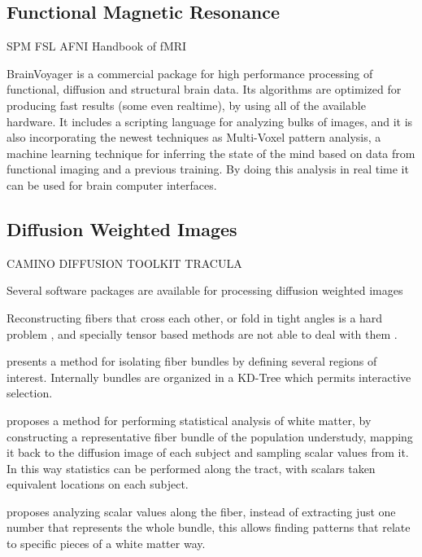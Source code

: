 \subsection{Functional Magnetic Resonance}

SPM
FSL
AFNI
Handbook of fMRI

BrainVoyager \autocite{goebel_brainvoyagerpast_2012} is a commercial package for high performance processing of functional, diffusion and structural brain data. Its algorithms are optimized for producing fast results (some even realtime), by using all of the available hardware. It includes a scripting language for analyzing bulks of images, and it is also incorporating the newest techniques as Multi-Voxel pattern analysis, a machine learning technique for inferring the state of the mind based on data from functional imaging and a previous training. By doing this analysis in real time it can be used for brain computer interfaces. 

\subsection{Diffusion Weighted Images}

CAMINO
DIFFUSION TOOLKIT
TRACULA



Several software packages are available for processing diffusion weighted images \autocite{hasan_review_2011}

Reconstructing fibers that cross each other, or fold in tight angles is a hard problem \autocite{fillard_quantitative_2011}, and specially tensor based methods are not able to deal with them \autocite{tournier_diffusion_2011}.


\autocite{blaas_fast_2005} presents a method for isolating fiber bundles by defining several regions of interest. Internally bundles are organized in a KD-Tree which permits interactive selection.

\autocite{goodlett_group_2008} proposes a method for performing statistical analysis of white matter, by constructing a representative fiber bundle of the population understudy, mapping it back to the diffusion image of each subject and sampling scalar values from it. In this way statistics can be performed along the tract, with scalars taken equivalent locations on each subject.

\autocite{colby_along-tract_2011} proposes analyzing scalar values along the fiber, instead of extracting just one number that represents the whole bundle, this allows finding patterns that relate to specific pieces of a white matter way.


